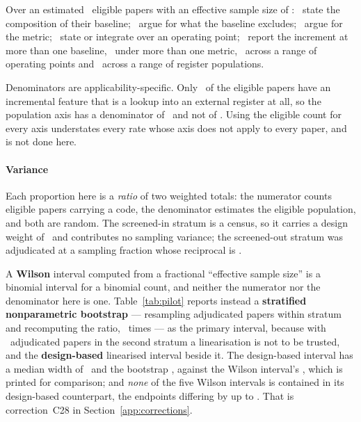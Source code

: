 

Over an estimated \nAuditEligible\ eligible papers with an effective sample
size of \nAuditEffective: \auditBStatedPct\ state the composition of their
baseline; \auditBJustifiedPct\ argue for what the baseline excludes;
\auditMJustifiedPct\ argue for the metric; \auditThetaStatedPct\ state or
integrate over an operating point; \auditRangeBaselinePct\ report the
increment at more than one baseline, \auditRangeMetricPct\ under more than one
metric, \auditRangeThresholdPct\ across a range of operating points and
\auditRangePopulationPct\ across a range of register populations.

Denominators are applicability-specific. Only \nAuditApplicable\ of the
eligible papers have an incremental feature that is a lookup into an external
register at all, so the population axis has a denominator of
\nAuditApplicable\ and not of \nAuditEligible. Using the eligible count for
every axis understates every rate whose axis does not apply to every paper,
and is not done here.

\paragraph{Variance}
Each proportion here is a \emph{ratio} of two weighted totals: the numerator
counts eligible papers carrying a code, the denominator estimates the eligible
population, and both are random. The screened-in stratum is a census, so it
carries a design weight of \auditWeightIn\ and contributes no sampling
variance; the screened-out stratum was adjudicated at a sampling fraction
whose reciprocal is \auditWeightOut.

A \textbf{Wilson} interval computed from a fractional ``effective sample
size'' is a binomial interval for a binomial count, and neither the numerator nor the denominator
here is one. Table~\ref{tab:pilot} reports instead a
\textbf{stratified nonparametric bootstrap} --- resampling adjudicated papers
within stratum and recomputing the ratio, \nPilotBoot\ times --- as the
primary interval, because with \nAuditOutSampled\ adjudicated papers in the
second stratum a linearisation is not to be trusted, and the
\textbf{design-based} linearised interval beside it. The design-based interval
has a median width of \auditDesignWidthPts\ and the
bootstrap \auditBootWidthPts, against the Wilson interval's
\auditWilsonWidthPts, which is printed for comparison; and \emph{none} of the five Wilson intervals is
contained in its design-based counterpart, the endpoints differing by up to
\auditMaxGapPts. That is correction~C28 in
Section~\ref{app:corrections}.

